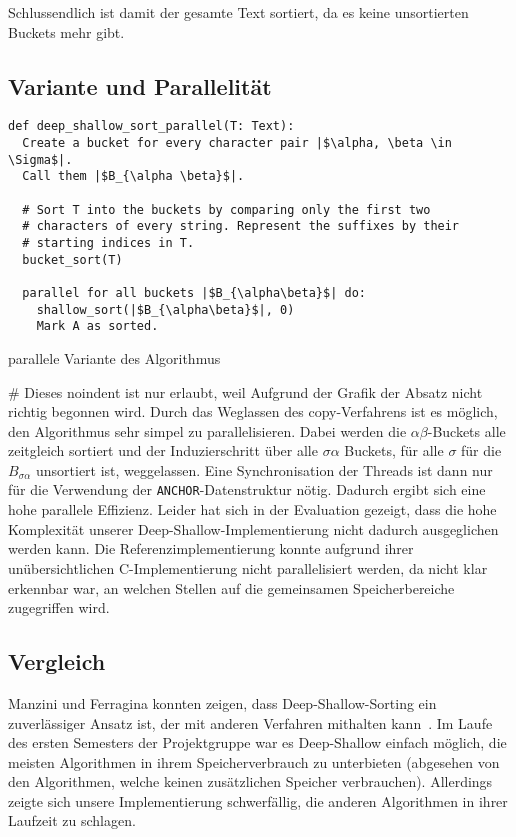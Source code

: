 Schlussendlich ist damit der gesamte Text sortiert, da es keine unsortierten Buckets mehr gibt.


\subsection{Variante und Parallelität}

\begin{listing}[!h]
\begin{verbatim}
def deep_shallow_sort_parallel(T: Text):
  Create a bucket for every character pair |$\alpha, \beta \in \Sigma$|.
  Call them |$B_{\alpha \beta}$|.

  # Sort T into the buckets by comparing only the first two
  # characters of every string. Represent the suffixes by their
  # starting indices in T.
  bucket_sort(T)

  parallel for all buckets |$B_{\alpha\beta}$| do:
    shallow_sort(|$B_{\alpha\beta}$|, 0)
    Mark A as sorted.
\end{verbatim}
\caption{parallele Variante des Algorithmus}
\label{ds:alg:main}
\end{listing}

# Dieses noindent ist nur erlaubt, weil Aufgrund der Grafik der Absatz nicht richtig begonnen wird.
\noindent Durch das Weglassen des copy-Verfahrens ist es möglich, den Algorithmus sehr simpel zu parallelisieren.
Dabei werden die $\alpha\beta$-Buckets alle zeitgleich sortiert und
der Induzierschritt über alle $\sigma\alpha$ Buckets, für alle $\sigma$ für die $B_{\sigma\alpha}$ unsortiert ist, weggelassen.
Eine Synchronisation der Threads ist dann nur für die Verwendung der \texttt{ANCHOR}-Datenstruktur nötig.
Dadurch ergibt sich eine hohe parallele Effizienz.
Leider hat sich in der Evaluation gezeigt, dass die hohe Komplexität unserer
Deep-Shallow-Implementierung nicht dadurch ausgeglichen werden kann.
Die Referenzimplementierung konnte aufgrund ihrer unübersichtlichen C-Implementierung nicht parallelisiert werden,
da nicht klar erkennbar war, an welchen Stellen auf die gemeinsamen Speicherbereiche zugegriffen wird.

\subsection{Vergleich}
Manzini und Ferragina konnten zeigen, dass Deep-Shallow-Sorting ein zuverlässiger Ansatz ist, der mit anderen Verfahren mithalten kann~\cite{saca:4}.
Im Laufe des ersten Semesters der Projektgruppe war es Deep-Shallow einfach möglich,
die meisten Algorithmen in ihrem Speicherverbrauch zu unterbieten (abgesehen von den Algorithmen, welche keinen zusätzlichen Speicher verbrauchen).
Allerdings zeigte sich unsere Implementierung schwerfällig, die anderen Algorithmen in ihrer Laufzeit zu schlagen.